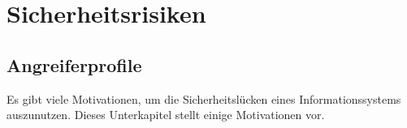 \newpage
\section{Sicherheitsrisiken} \label{sicherheitsrisiken}


\subsection{Angreiferprofile}

Es gibt viele Motivationen, um die Sicherheitslücken eines Informationssystems
auszunutzen. Dieses Unterkapitel stellt einige Motivationen vor.


